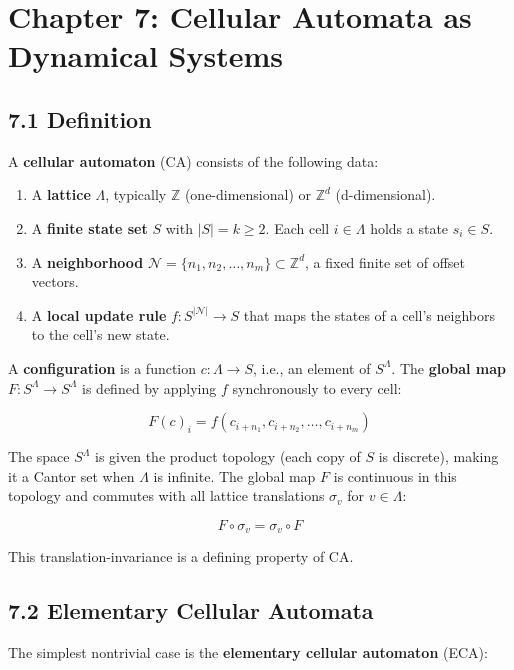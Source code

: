 \chapter{Chapter 7: Cellular Automata as Dynamical Systems}

\section{7.1 Definition}

A \textbf{cellular automaton} (CA) consists of the following data:

\begin{enumerate}
  \item A \textbf{lattice} $\Lambda$, typically $\mathbb{Z}$ (one-dimensional) or $\mathbb{Z}^d$ (d-dimensional).
  \item A \textbf{finite state set} $S$ with $|S| = k \geq 2$. Each cell $i \in \Lambda$ holds a state $s_i \in S$.
  \item A \textbf{neighborhood} $\mathcal{N} = \{ n_1, n_2, \ldots, n_m\}  \subset \mathbb{Z}^d$, a fixed finite set of offset vectors.
  \item A \textbf{local update rule} $f: S^{|\mathcal{N}|} \to S$ that maps the states of a cell's neighbors to the cell's new state.
\end{enumerate}

A \textbf{configuration} is a function $c: \Lambda \to S$, i.e., an element of $S^{\Lambda}$. The \textbf{global map} $F: S^{\Lambda} \to S^{\Lambda}$ is defined by applying $f$ synchronously to every cell:

\[
F(c)_i = f(c_{i + n_1}, c_{i + n_2}, \ldots, c_{i + n_m})
\]

The space $S^{\Lambda}$ is given the product topology (each copy of $S$ is discrete), making it a Cantor set when $\Lambda$ is infinite. The global map $F$ is continuous in this topology and commutes with all lattice translations $\sigma_v$ for $v \in \Lambda$:

\[
F \circ \sigma_v = \sigma_v \circ F
\]

This translation-invariance is a defining property of CA.


\section{7.2 Elementary Cellular Automata}

The simplest nontrivial case is the \textbf{elementary cellular automaton} (ECA):

